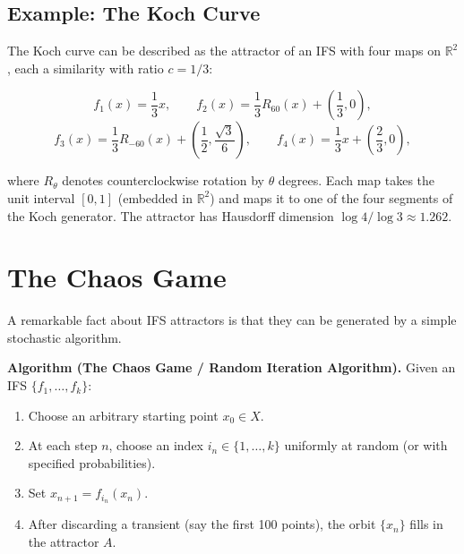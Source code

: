 \subsection*{Example: The Koch Curve}

The Koch curve can be described as the attractor of an IFS with four maps on $\mathbb{R}^2$, each a similarity with ratio $c = 1/3$:

\[f_1(x) = \frac{1}{3}x, \qquad f_2(x) = \frac{1}{3}R_{60}(x) + \left(\frac{1}{3}, 0\right),\]
\[f_3(x) = \frac{1}{3}R_{-60}(x) + \left(\frac{1}{2}, \frac{\sqrt{3}}{6}\right), \qquad f_4(x) = \frac{1}{3}x + \left(\frac{2}{3}, 0\right),\]

where $R_\theta$ denotes counterclockwise rotation by $\theta$ degrees. Each map takes the unit interval $[0, 1]$ (embedded in $\mathbb{R}^2$) and maps it to one of the four segments of the Koch generator. The attractor has Hausdorff dimension $\log 4 / \log 3 \approx 1.262$.

\section{The Chaos Game}

A remarkable fact about IFS attractors is that they can be generated by a simple stochastic algorithm.

\textbf{Algorithm (The Chaos Game / Random Iteration Algorithm).}
Given an IFS $\{ f_1, \ldots, f_k\}$:
\begin{enumerate}
\item Choose an arbitrary starting point $x_0 \in X$.
\item At each step $n$, choose an index $i_n \in \{ 1, \ldots, k\}$ uniformly at random (or with specified probabilities).
\item Set $x_{n+1} = f_{i_n}(x_n)$.
\item After discarding a transient (say the first 100 points), the orbit $\{ x_n\}$ fills in the attractor $A$.
\end{enumerate}

